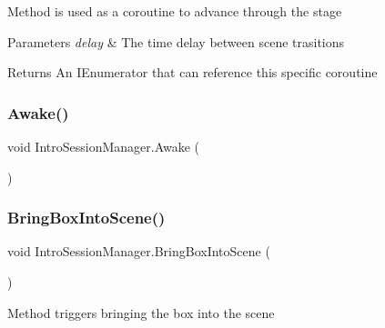 Method is used as a coroutine to advance through the stage 


\begin{DoxyParams}{Parameters}
{\em delay} & The time delay between scene trasitions\\
\hline
\end{DoxyParams}
\begin{DoxyReturn}{Returns}
An I\+Enumerator that can reference this specific coroutine
\end{DoxyReturn}
\mbox{\label{class_intro_session_manager_a7c36bee635e59c09531ed8c64665b0fd}} 
\subsubsection{\texorpdfstring{Awake()}{Awake()}}
{\footnotesize\ttfamily void Intro\+Session\+Manager.\+Awake (\begin{DoxyParamCaption}{ }\end{DoxyParamCaption})\hspace{0.3cm}{\ttfamily [private]}}

\mbox{\label{class_intro_session_manager_a7f844de6716bc367d539bd3a0dd835de}} 
\subsubsection{\texorpdfstring{Bring\+Box\+Into\+Scene()}{BringBoxIntoScene()}}
{\footnotesize\ttfamily void Intro\+Session\+Manager.\+Bring\+Box\+Into\+Scene (\begin{DoxyParamCaption}{ }\end{DoxyParamCaption})}



Method triggers bringing the box into the scene 

\mbox{\label{class_intro_session_manager_af70a43fd234d1f362d0b9d75a613e9db}} 
